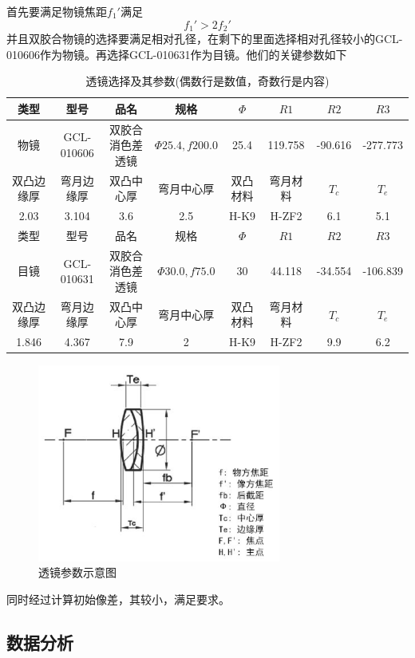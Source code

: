 \documentclass{article}
\begin{document}
首先要满足物镜焦距$f_1'$满足
\[f_1'>2f_2'\]
并且双胶合物镜的选择要满足相对孔径，在剩下的里面选择相对孔径较小的GCL-010606作为物镜。再选择GCL-010631作为目镜。他们的关键参数如下
\begin{table}[H]
  \centering
  \begin{tabular}{cccccccc}
  \hline
  类型&型号&品名&规格&$\Phi$&$R1$&$R 2$&$R 3$ \\ \hline
  物镜&GCL-010606
  &双胶合消色差透镜
  &$\Phi25.4,f200.0$ &
  25.4
  &
  119.758
  &
  -90.616
  &-277.773\\ \hline \hline
  双凸边缘厚&
弯月边缘厚&双凸中心厚&
弯月中心厚&
双凸材料&
弯月材料&$T_c$&$T_e$ \\ \hline
2.03&
3.104&
3.6&
2.5&
H-K9&
H-ZF2&6.1&5.1\\ \hline\hline
类型&型号&品名&规格&$\Phi$&$R1$&$R 2$&$R 3$ \\ \hline
  目镜&GCL-010631
  &双胶合消色差透镜
 & $\Phi30.0,f75.0$&30&
 
 44.118&-34.554&-106.839
 \\ \hline \hline
 双凸边缘厚&
弯月边缘厚&双凸中心厚&
弯月中心厚&
双凸材料&
弯月材料&$T_c$&$T_e$ \\ \hline 
1.846&
4.367&
7.9&
2&
H-K9&
H-ZF2&
9.9&
6.2\\ \hline
  \end{tabular}
  \caption{透镜选择及其参数(偶数行是数值，奇数行是内容)}
  \end{table}
          \begin{figure}[H]
              \centering
              \includegraphics[width=8cm]{img/3.png}
              \caption[]{透镜参数示意图}
              \end{figure}

同时经过计算初始像差，其较小，满足要求。
\subsection{数据分析}
\end{document}
